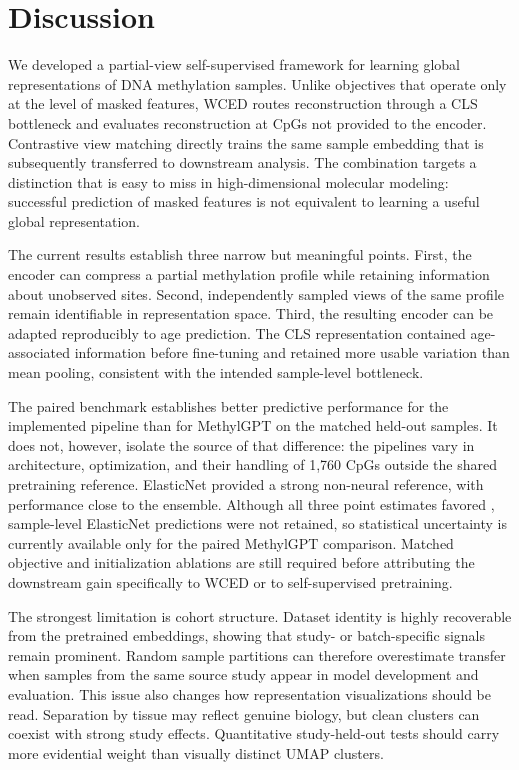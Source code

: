 \section{Discussion}

We developed a partial-view self-supervised framework for learning global representations of
DNA methylation samples. Unlike objectives that operate only at the level of masked features,
WCED routes reconstruction through a CLS bottleneck and evaluates reconstruction at CpGs not
provided to the encoder. Contrastive view matching directly trains the same sample embedding
that is subsequently transferred to downstream analysis. The combination targets a distinction
that is easy to miss in high-dimensional molecular modeling: successful prediction of masked
features is not equivalent to learning a useful global representation.

The current results establish three narrow but meaningful points. First, the encoder can
compress a partial methylation profile while retaining information about unobserved sites.
Second, independently sampled views of the same profile remain identifiable in representation
space. Third, the resulting encoder can be adapted reproducibly to age prediction. The CLS
representation contained age-associated information before fine-tuning and retained more
usable variation than mean pooling, consistent with the intended sample-level bottleneck.

The paired benchmark establishes better predictive performance for the implemented
\method{} pipeline than for MethylGPT on the matched held-out samples. It does not, however,
isolate the source of that difference: the pipelines vary in architecture, optimization, and
their handling of 1,760 CpGs outside the shared pretraining reference. ElasticNet provided a
strong non-neural reference, with performance close to the \method{} ensemble. Although all
three point estimates favored \method{}, sample-level ElasticNet predictions were not retained,
so statistical uncertainty is currently available only for the paired MethylGPT comparison.
Matched objective and initialization ablations are still required before attributing the
downstream gain specifically to WCED or to self-supervised pretraining.

The strongest limitation is cohort structure. Dataset identity is highly recoverable from the
pretrained embeddings, showing that study- or batch-specific signals remain prominent. Random
sample partitions can therefore overestimate transfer when samples from the same source study
appear in model development and evaluation. This issue also changes how representation
visualizations should be read. Separation by tissue may reflect genuine biology, but clean
clusters can coexist with strong study effects. Quantitative study-held-out tests should carry
more evidential weight than visually distinct UMAP clusters.

